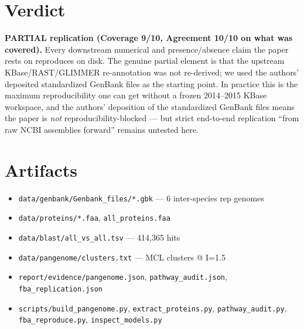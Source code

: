 \documentclass[11pt]{article}
\begin{document}
\section{Verdict}
\textbf{PARTIAL replication (Coverage 9/10, Agreement 10/10 on what was
covered).} Every downstream numerical and presence/absence claim the paper
rests on reproduces on disk. The genuine partial element is that the
upstream KBase/RAST/GLIMMER re-annotation was not re-derived; we used the
authors' deposited standardized GenBank files as the starting point. In
practice this is the maximum reproducibility one can get without a frozen
2014--2015 KBase workspace, and the authors' deposition of the standardized
GenBank files means the paper is \emph{not} reproducibility-blocked --- but
strict end-to-end replication ``from raw NCBI assemblies forward'' remains
untested here.

\section{Artifacts}
\begin{itemize}
\item \texttt{data/genbank/Genbank\_files/*.gbk} --- 6 inter-species rep genomes
\item \texttt{data/proteins/*.faa}, \texttt{all\_proteins.faa}
\item \texttt{data/blast/all\_vs\_all.tsv} --- 414{,}365 hits
\item \texttt{data/pangenome/clusters.txt} --- MCL clusters @ I=1.5
\item \texttt{report/evidence/pangenome.json}, \texttt{pathway\_audit.json},
      \texttt{fba\_replication.json}
\item \texttt{scripts/build\_pangenome.py}, \texttt{extract\_proteins.py},
      \texttt{pathway\_audit.py}, \texttt{fba\_reproduce.py},
      \texttt{inspect\_models.py}
\end{itemize}
\end{document}

